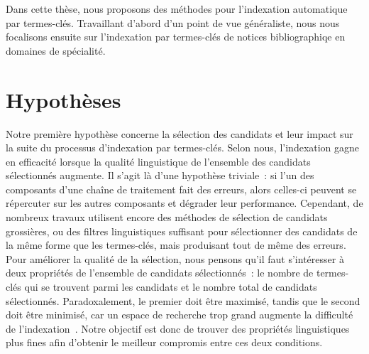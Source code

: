     Dans cette thèse, nous proposons des méthodes pour l'indexation automatique
    par termes-clés. Travaillant d'abord d'un point de vue généraliste, nous
    nous focalisons ensuite sur l'indexation par termes-clés de notices
    bibliographiqe en domaines de spécialité.


  \section{Hypothèses}
  \label{sec:main-introduction-hypothesis}
    Notre première hypothèse concerne la sélection des candidats et leur impact
    sur la suite du processus d'indexation par termes-clés. Selon nous,
    l'indexation gagne en efficacité lorsque la qualité linguistique de
    l'ensemble des candidats sélectionnés augmente.
    Il s'agit là d'une hypothèse triviale~: si l'un des composants d'une chaîne
    de traitement fait des erreurs, alors celles-ci peuvent se répercuter sur
    les autres composants et dégrader leur performance. Cependant, de nombreux
    travaux utilisent encore des méthodes de sélection de candidats grossières,
    ou des filtres linguistiques suffisant pour sélectionner des candidats
    de la même forme que les termes-clés, mais produisant tout de même des
    erreurs.
    Pour améliorer la qualité de la sélection, nous pensons qu'il faut
    s'intéresser à deux propriétés de l'ensemble de candidats sélectionnés~: le
    nombre de termes-clés qui se trouvent parmi les candidats et le nombre total
    de candidats sélectionnés. Paradoxalement, le premier doit être maximisé,
    tandis que le second doit être minimisé, car un espace de recherche trop
    grand augmente la difficulté de
    l'indexation~\cite{hasan2014state_of_the_art}.
    Notre objectif est donc de trouver des propriétés linguistiques plus fines
    afin d'obtenir le meilleur compromis entre ces deux conditions.
    

